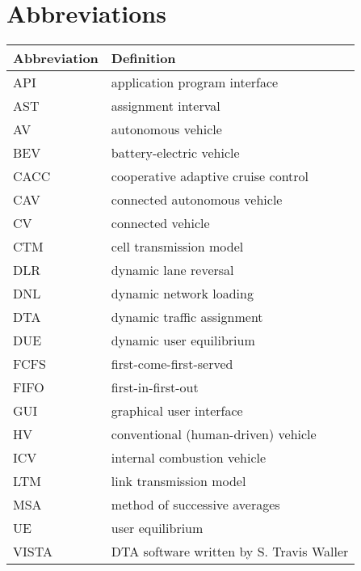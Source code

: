 \chapter{Abbreviations}

\begin{longtable}{ll}
\hline
Abbreviation & Definition\\\hline
\endhead
API & application program interface\\
AST & assignment interval\\
AV & autonomous vehicle\\
BEV & battery-electric vehicle\\
CACC & cooperative adaptive cruise control\\
CAV & connected autonomous vehicle\\
CV & connected vehicle \\
CTM &  cell transmission model~\cite{daganzo1994cell, daganzo1995cell}\\
DLR & dynamic lane reversal~\cite{levin2016cell, duell2016system} \\
DNL & dynamic network loading~\cite{chiu2011dynamic} \\
DTA & dynamic traffic assignment~\cite{chiu2011dynamic} \\
DUE & dynamic user equilibrium~\cite{wardrop1952road, chiu2011dynamic} \\
FCFS & first-come-first-served~\cite{fajardo2011automated}\\
FIFO & first-in-first-out\\
GUI & graphical user interface\\
HV & conventional (human-driven) vehicle\\
ICV & internal combustion vehicle\cite{levin2014effect}\\
LTM & link transmission model~\cite{yperman2005link, yperman2007link}\\
MSA & method of successive averages\cite{levin2014improving}\\
UE & user equilibrium~\cite{wardrop1952road}\\
VISTA & DTA software written by S. Travis Waller\cite{ziliaskopoulos2000internet}\\
\hline
\end{longtable}